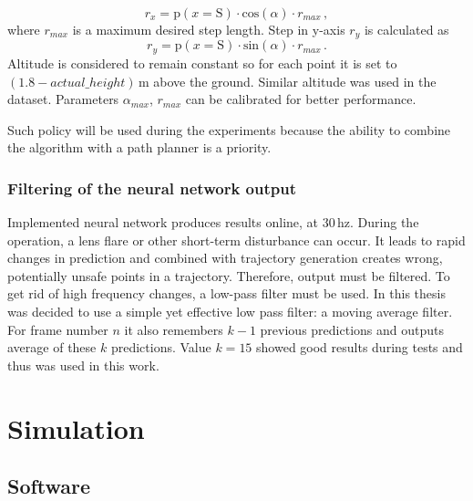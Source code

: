 \begin{equation}
	r_x = \textrm{p}(x = \textrm{S})\cdot \textrm{cos}(\alpha)\cdot r_{max}\,,
\end{equation}
where $r_{max}$ is a maximum desired step length. Step in y-axis $r_y$ is calculated as
\begin{equation}
	r_y = \textrm{p}(x = \textrm{S})\cdot \textrm{sin}(\alpha)\cdot r_{max}\,.
\end{equation}
Altitude is considered to remain constant so for each point it is set to $(1.8 - actual\_height)$\,m above the ground. Similar altitude was used in the dataset. Parameters $\alpha_{max}$, $r_{max}$ can be calibrated for better performance.

Such policy will be used during the experiments because the ability to combine the algorithm with a path planner is a priority.

\subsection{Filtering of the neural network output}

Implemented neural network produces results online, at 30\,hz. During the operation, a lens flare or other short-term disturbance can occur. It leads to rapid changes in prediction and combined with trajectory generation creates wrong, potentially unsafe points in a trajectory. Therefore, output must be filtered. To get rid of high frequency changes, a low-pass filter must be used. In this thesis was decided to use a simple yet effective low pass filter: a moving average filter. For frame number $n$ it also remembers $k-1$ previous predictions and outputs average of these $k$ predictions. Value $k=15$ showed good results during tests and thus was used in this work.


\chapter{Simulation}



\section{Software}

